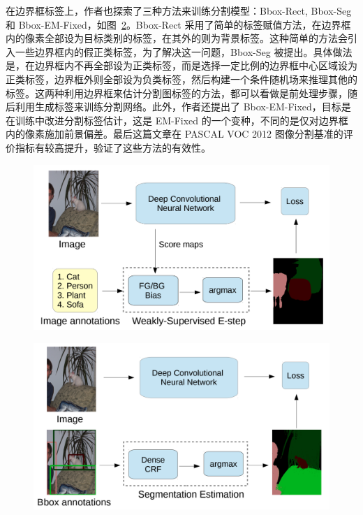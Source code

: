在边界框标签上，作者也探索了三种方法来训练分割模型：Bbox-Rect, Bbox-Seg 和 Bbox-EM-Fixed，如图~\ref{c2_fig2}。Bbox-Rect 采用了简单的标签赋值方法，在边界框内的像素全部设为目标类别的标签，在其外的则为背景标签。这种简单的方法会引入一些边界框内的假正类标签，为了解决这一问题，Bbox-Seg 被提出。具体做法是，在边界框内不再全部设为正类标签，而是选择一定比例的边界框中心区域设为正类标签，边界框外则全部设为负类标签，然后构建一个条件随机场来推理其他的标签。这两种利用边界框来估计分割图标签的方法，都可以看做是前处理步骤，随后利用生成标签来训练分割网络。此外，作者还提出了 Bbox-EM-Fixed，目标是在训练中改进分割标签估计，这是 EM-Fixed 的一个变种，不同的是仅对边界框内的像素施加前景偏差。最后这篇文章在 PASCAL VOC 2012 图像分割基准的评价指标有较高提升，验证了这些方法的有效性。


    \begin{figure}[tbp]
        \centering 
        \includegraphics[width=1.0\textwidth]{img/c2/rel_a1.png}
        \label{c2_fig1}
    \end{figure}

    \begin{figure}[tbp]
        \centering 
        \includegraphics[width=1.0\textwidth]{img/c2/rel_a2.png}
        \label{c2_fig2}
    \end{figure}

